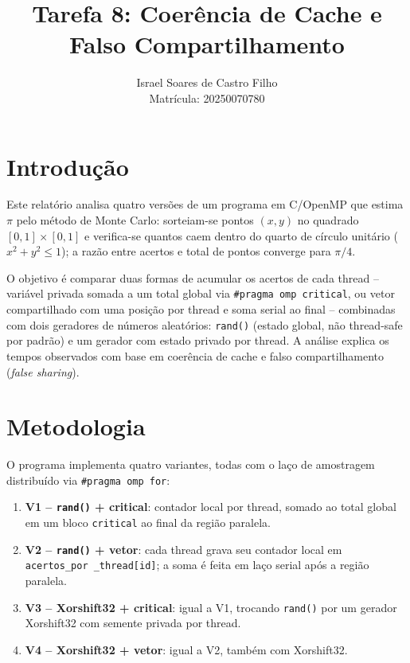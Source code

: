 \documentclass[a4paper,12pt]{article}
\title{Tarefa 8: Coerência de Cache e Falso Compartilhamento}
\author{Israel Soares de Castro Filho \\ Matrícula: 20250070780}
\date{}
\begin{document}
\maketitle

\section{Introdução}

Este relatório analisa quatro versões de um programa em C/OpenMP que estima $\pi$ pelo método de Monte
Carlo: sorteiam-se pontos $(x,y)$ no quadrado $[0,1]\times[0,1]$ e verifica-se quantos caem dentro do
quarto de círculo unitário ($x^2+y^2 \le 1$); a razão entre acertos e total de pontos converge para
$\pi/4$.

O objetivo é comparar duas formas de acumular os acertos de cada thread -- variável privada somada a um
total global via \texttt{\#pragma omp critical}, ou vetor compartilhado com uma posição por thread e soma
serial ao final -- combinadas com dois geradores de números aleatórios: \texttt{rand()} (estado global,
não thread-safe por padrão) e um gerador com estado privado por thread. A análise explica os tempos
observados com base em coerência de cache e falso compartilhamento (\textit{false sharing}).

\section{Metodologia}

O programa implementa quatro variantes, todas com o laço de amostragem distribuído via
\texttt{\#pragma omp for}:

\begin{enumerate}
    \item \textbf{V1 -- \texttt{rand()} + critical}: contador local por thread, somado ao total global em
    um bloco \texttt{critical} ao final da região paralela.
    \item \textbf{V2 -- \texttt{rand()} + vetor}: cada thread grava seu contador local em \texttt{acertos\_por
    \_thread[id]}; 
    a soma é feita em laço serial após a região paralela.
    \item \textbf{V3 -- Xorshift32 + critical}: igual a V1, trocando \texttt{rand()} por um gerador
    Xorshift32 com semente privada por thread.
    \item \textbf{V4 -- Xorshift32 + vetor}: igual a V2, também com Xorshift32.
\end{enumerate}
\end{document}
